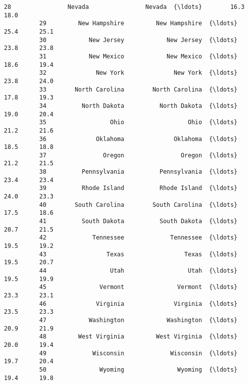 \documentclass[11pt]{article}
\begin{document}
\begin{Verbatim}[commandchars=\\\{\}]
          28                Nevada                Nevada  {\ldots}        16.3      18.0   
          29         New Hampshire         New Hampshire  {\ldots}        25.4      25.1   
          30            New Jersey            New Jersey  {\ldots}        23.8      23.8   
          31            New Mexico            New Mexico  {\ldots}        18.6      19.4   
          32              New York              New York  {\ldots}        23.8      24.0   
          33        North Carolina        North Carolina  {\ldots}        17.8      19.3   
          34          North Dakota          North Dakota  {\ldots}        19.0      20.4   
          35                  Ohio                  Ohio  {\ldots}        21.2      21.6   
          36              Oklahoma              Oklahoma  {\ldots}        18.5      18.8   
          37                Oregon                Oregon  {\ldots}        21.2      21.5   
          38          Pennsylvania          Pennsylvania  {\ldots}        23.4      23.4   
          39          Rhode Island          Rhode Island  {\ldots}        24.0      23.3   
          40        South Carolina        South Carolina  {\ldots}        17.5      18.6   
          41          South Dakota          South Dakota  {\ldots}        20.7      21.5   
          42             Tennessee             Tennessee  {\ldots}        19.5      19.2   
          43                 Texas                 Texas  {\ldots}        19.5      20.7   
          44                  Utah                  Utah  {\ldots}        19.5      19.9   
          45               Vermont               Vermont  {\ldots}        23.3      23.1   
          46              Virginia              Virginia  {\ldots}        23.5      23.3   
          47            Washington            Washington  {\ldots}        20.9      21.9   
          48         West Virginia         West Virginia  {\ldots}        20.0      19.4   
          49             Wisconsin             Wisconsin  {\ldots}        19.7      20.4   
          50               Wyoming               Wyoming  {\ldots}        19.4      19.8   
          

\end{Verbatim}
\end{document}
